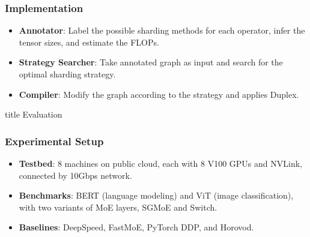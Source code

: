 \documentclass[12pt,aspectratio=169]{beamer}
\begin{document}
    \begin{frame}
        \frametitle{Implementation}

        \begin{itemize}
            \setlength{\itemsep}{.8em}
            \item \textbf{Annotator}: Label the possible sharding methods for each operator, infer the tensor sizes, and estimate the FLOPs.
            \item \textbf{Strategy Searcher}: Take annotated graph as input and search for the optimal sharding strategy.
            \item \textbf{Compiler}: Modify the graph according to the strategy and applies Duplex.
        \end{itemize}

    \end{frame}

    \begin{frame}
        \centering
        \begin{beamercolorbox}[sep=8pt,center,shadow=true,rounded=true]{title}
          Evaluation\par%
        \end{beamercolorbox}
    \end{frame}

    \begin{frame}
        \frametitle{Experimental Setup}

        \begin{itemize}
            \setlength{\itemsep}{.8em}
            \item \textbf{Testbed}: 8 machines on public cloud, each with 8 V100 GPUs and NVLink, connected by 10Gbps network.
            \item \textbf{Benchmarks}: BERT (language modeling) and ViT (image classification), with two variants of MoE layers, SGMoE and Switch.
            \item \textbf{Baselines}: DeepSpeed, FastMoE, PyTorch DDP, and Horovod.
        \end{itemize}
    \end{frame}
\end{document}
